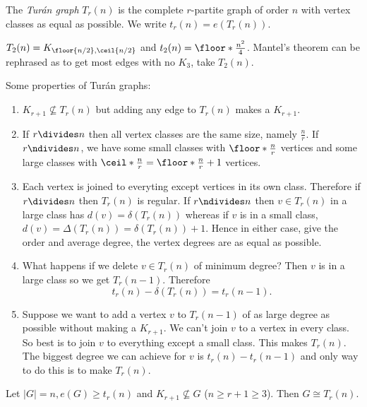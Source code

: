 \documentclass[a4paper]{article}
\begin{document}
\begin{definition}
  The \emph{Turán graph} \(T_r(n)\) is the complete \(r\)-partite graph of order \(n\) with vertex classes as equal as possible. We write \(t_r(n) = e(T_r(n))\).
\end{definition}

\begin{eg}
  \(T_2(n) = K_{\floor{n/2}, \ceil{n/2}}\) and \(t_2(n) = \floor*{\frac{n^2}{4}}\). Mantel's theorem can be rephrased as to get most edges with no \(K_3\), take \(T_2(n)\).
\end{eg}

Some properties of Turán graphs:
\begin{enumerate}
\item \(K_{r + 1} \nsubseteq T_r(n)\) but adding any edge to \(T_r(n)\) makes a \(K_{r + 1}\).
\item If \(r \divides n\) then all vertex classes are the same size, namely \(\frac{n}{r}\). If \(r \ndivides n\), we have some small classes with \(\floor*{\frac{n}{r}}\) vertices and some large classes with \(\ceil*{\frac{n}{r}} = \floor*{\frac{n}{r}} + 1\) vertices.
\item Each vertex is joined to everyting except vertices in its own class. Therefore if \(r \divides n\) then \(T_r(n)\) is regular. If \(r \ndivides n\) then \(v \in T_r(n)\) in a large class has \(d(v) = \delta(T_r(n))\) whereas if \(v\) is in a small class, \(d(v) = \Delta(T_r(n)) = \delta(T_r(n)) + 1\). Hence in either case, give the order and average degree, the vertex degrees are as equal as possible.
\item What happens if we delete \(v \in T_r(n)\) of minimum degree? Then \(v\) is in a large class so we get \(T_r(n - 1)\). Therefore
  \[
    t_r(n) - \delta(T_r(n)) = t_r(n - 1).
  \]
\item Suppose we want to add a vertex \(v\) to \(T_r(n - 1)\) of as large degree as possible without making a \(K_{r + 1}\). We can't join \(v\) to a vertex in every class. So best is to join \(v\) to everything except a small class. This makes \(T_r(n)\). The biggest degree we can achieve for \(v\) is \(t_r(n) - t_r(n - 1)\) and only way to do this is to make \(T_r(n)\).
\end{enumerate}

\begin{theorem}[Turán]
  Let \(|G| = n, e(G) \geq t_r(n)\) and \(K_{r + 1} \nsubseteq G\) (\(n \geq r + 1 \geq 3\)). Then \(G \cong T_r(n)\).
\end{theorem}
\end{document}
